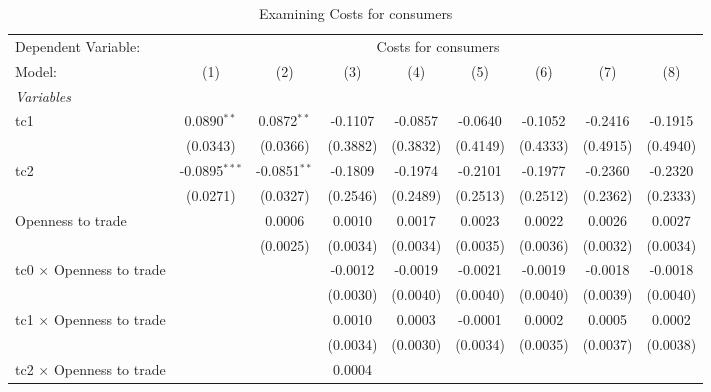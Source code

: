 
\begin{table}[htbp]
   \caption{Examining Costs for consumers}
   \centering
   \begin{tabular}{lcccccccc}
      \tabularnewline \midrule \midrule
      Dependent Variable: & \multicolumn{8}{c}{Costs for consumers}\\
      Model:                                  & (1)             & (2)            & (3)      & (4)      & (5)      & (6)      & (7)      & (8)\\  
      \midrule
      \emph{Variables}\\
      tc1                                     & 0.0890$^{**}$   & 0.0872$^{**}$  & -0.1107  & -0.0857  & -0.0640  & -0.1052  & -0.2416  & -0.1915\\   
                                              & (0.0343)        & (0.0366)       & (0.3882) & (0.3832) & (0.4149) & (0.4333) & (0.4915) & (0.4940)\\   
      tc2                                     & -0.0895$^{***}$ & -0.0851$^{**}$ & -0.1809  & -0.1974  & -0.2101  & -0.1977  & -0.2360  & -0.2320\\   
                                              & (0.0271)        & (0.0327)       & (0.2546) & (0.2489) & (0.2513) & (0.2512) & (0.2362) & (0.2333)\\   
      Openness to trade                       &                 & 0.0006         & 0.0010   & 0.0017   & 0.0023   & 0.0022   & 0.0026   & 0.0027\\   
                                              &                 & (0.0025)       & (0.0034) & (0.0034) & (0.0035) & (0.0036) & (0.0032) & (0.0034)\\   
      tc0 $\times$ Openness to trade          &                 &                & -0.0012  & -0.0019  & -0.0021  & -0.0019  & -0.0018  & -0.0018\\   
                                              &                 &                & (0.0030) & (0.0040) & (0.0040) & (0.0040) & (0.0039) & (0.0040)\\   
      tc1 $\times$ Openness to trade          &                 &                & 0.0010   & 0.0003   & -0.0001  & 0.0002   & 0.0005   & 0.0002\\   
                                              &                 &                & (0.0034) & (0.0030) & (0.0034) & (0.0035) & (0.0037) & (0.0038)\\   
      tc2 $\times$ Openness to trade          &                 &                & 0.0004   &          &          &          &          &   \\   

\end{tabular}
\end{table}
